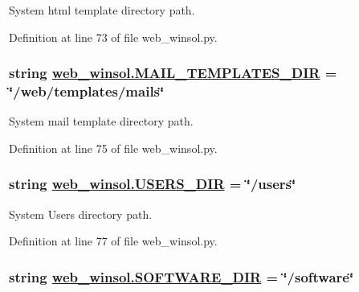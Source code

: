 System html template directory path. 



Definition at line 73 of file web\_\-winsol.py.\hypertarget{namespaceweb__winsol_f1688133afaa1ae7f229f772e63d8eb2}{
\subsubsection[MAIL\_\-TEMPLATES\_\-DIR]{\setlength{\rightskip}{0pt plus 5cm}string \hyperlink{namespaceweb__winsol_f1688133afaa1ae7f229f772e63d8eb2}{web\_\-winsol.MAIL\_\-TEMPLATES\_\-DIR} = \char`\"{}/web/templates/mails\char`\"{}}}
\label{namespaceweb__winsol_f1688133afaa1ae7f229f772e63d8eb2}


System mail template directory path. 



Definition at line 75 of file web\_\-winsol.py.\hypertarget{namespaceweb__winsol_67de5db9c4a2362e0eb7b76b42d7630c}{
\subsubsection[USERS\_\-DIR]{\setlength{\rightskip}{0pt plus 5cm}string \hyperlink{namespaceweb__winsol_67de5db9c4a2362e0eb7b76b42d7630c}{web\_\-winsol.USERS\_\-DIR} = \char`\"{}/users\char`\"{}}}
\label{namespaceweb__winsol_67de5db9c4a2362e0eb7b76b42d7630c}


System Users directory path. 



Definition at line 77 of file web\_\-winsol.py.\hypertarget{namespaceweb__winsol_e7552d7a2db57cdafa18403c7feb12b7}{
\subsubsection[SOFTWARE\_\-DIR]{\setlength{\rightskip}{0pt plus 5cm}string \hyperlink{namespaceweb__winsol_e7552d7a2db57cdafa18403c7feb12b7}{web\_\-winsol.SOFTWARE\_\-DIR} = \char`\"{}/software\char`\"{}}}
\label{namespaceweb__winsol_e7552d7a2db57cdafa18403c7feb12b7}


